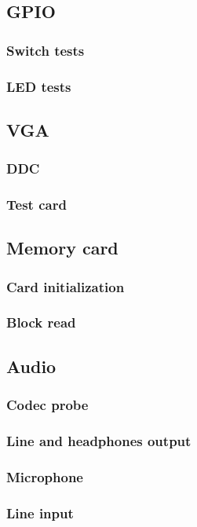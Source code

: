 \documentclass[a4paper,11pt]{article}
\begin{document}
\subsection{GPIO}
\subsubsection{Switch tests}
\subsubsection{LED tests}
\subsection{VGA}
\subsubsection{DDC}
\subsubsection{Test card}
\subsection{Memory card}
\subsubsection{Card initialization}
\subsubsection{Block read}
\subsection{Audio}
\subsubsection{Codec probe}
\subsubsection{Line and headphones output}
\subsubsection{Microphone}
\subsubsection{Line input}
\end{document}
